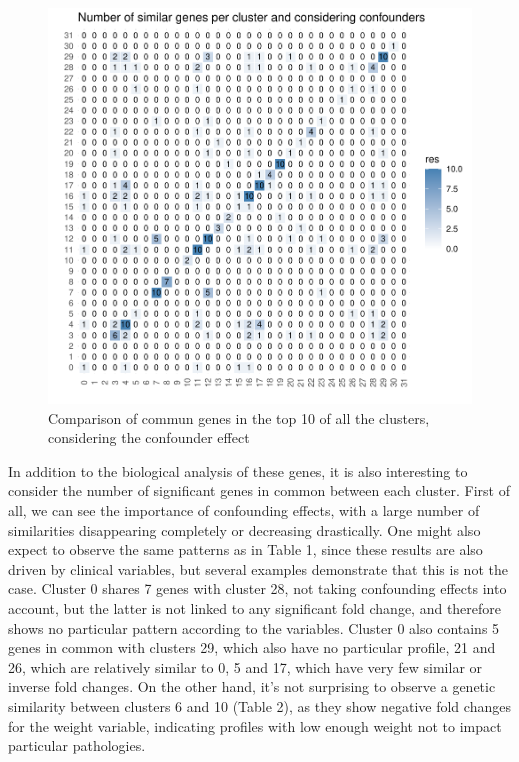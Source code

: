 \documentclass[a4paper, 11pt]{article}
\begin{document}
\begin{multicols}{2}
\begin{figure}[H]
	\includegraphics[width=\columnwidth]{figures/final_analysis/SimilConsideringConf}
	\caption{Comparison of commun genes in the top 10 of all the clusters, considering the confounder effect}
	\label{fig:similGenesConf}
\end{figure}
In addition to the biological analysis of these genes, it is also interesting to consider the number of significant genes in common between each cluster. First of all, we can see the importance of confounding effects, with a large number of similarities disappearing completely or decreasing drastically. One might also expect to observe the same patterns as in Table 1, since these results are also driven by clinical variables, but several examples demonstrate that this is not the case. Cluster 0 shares 7 genes with cluster 28, not taking confounding effects into account, but the latter is not linked to any significant fold change, and therefore shows no particular pattern according to the variables. Cluster 0 also contains 5 genes in common with clusters 29, which also have no particular profile, 21 and 26, which are relatively similar to 0, 5 and 17, which have very few similar or inverse fold changes. On the other hand, it's not surprising to observe a genetic similarity between clusters 6 and 10 (Table 2), as they show negative fold changes for the weight variable, indicating profiles with low enough weight not to impact particular pathologies.
\begin{table}[H]

\end{table}
\end{multicols}
\end{document}
